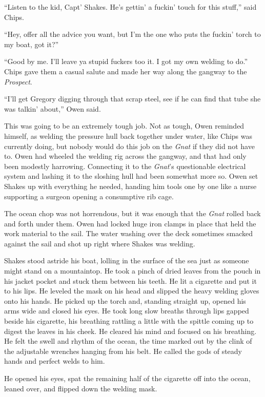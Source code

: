 \documentclass[
]{scrbook}
\begin{document}
``Listen to the kid, Capt' Shakes. He's gettin' a fuckin' touch for this
stuff,'' said Chips.

``Hey, offer all the advice you want, but I'm the one who puts the
fuckin' torch to my boat, got it?''

``Good by me. I'll leave ya stupid fuckers too it. I got my own welding
to do.'' Chips gave them a casual salute and made her way along the
gangway to the \emph{Prospect}.

``I'll get Gregory digging through that scrap steel, see if he can find
that tube she was talkin' about,'' Owen said.

\bigskip

This was going to be an extremely tough job. Not as tough, Owen reminded
himself, as welding the pressure hull back together under water, like
Chips was currently doing, but nobody would do this job on the
\emph{Gnat} if they did not have to. Owen had wheeled the welding rig
across the gangway, and that had only been modestly harrowing.
Connecting it to the \emph{Gnat}'s questionable electrical system and
lashing it to the sloshing hull had been somewhat more so. Owen set
Shakes up with everything he needed, handing him tools one by one like a
nurse supporting a surgeon opening a consumptive rib cage.

The ocean chop was not horrendous, but it was enough that the
\emph{Gnat} rolled back and forth under them. Owen had locked huge iron
clamps in place that held the work material to the sail. The water
washing over the deck sometimes smacked against the sail and shot up
right where Shakes was welding.

Shakes stood astride his boat, lolling in the surface of the sea just as
someone might stand on a mountaintop. He took a pinch of dried leaves
from the pouch in his jacket pocket and stuck them between his teeth. He
lit a cigarette and put it to his lips. He leveled the mask on his head
and slipped the heavy welding gloves onto his hands. He picked up the
torch and, standing straight up, opened his arms wide and closed his
eyes. He took long slow breaths through lips gapped beside his
cigarette, his breathing rattling a little with the spittle coming up to
digest the leaves in his cheek. He cleared his mind and focused on his
breathing. He felt the swell and rhythm of the ocean, the time marked
out by the clink of the adjustable wrenches hanging from his belt. He
called the gods of steady hands and perfect welds to him.

He opened his eyes, spat the remaining half of the cigarette off into
the ocean, leaned over, and flipped down the welding mask.
\end{document}
